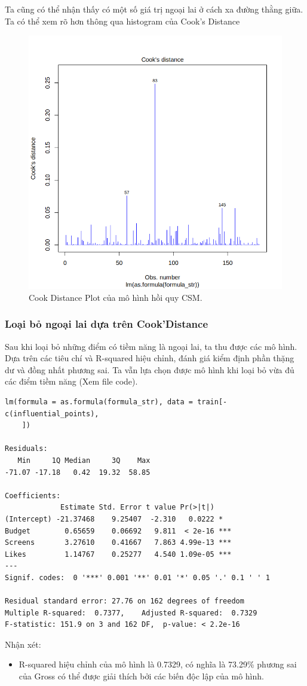 Ta cũng có thể nhận thấy có một số giá trị ngoại lai ở cách xa đường thằng giữa. Ta có thể xem rõ hơn thông qua histogram của Cook's Distance
\begin{figure}[H]
    \centering
    \includegraphics[width=0.75\columnwidth]{csm_figures/best_csm_model_cook.png}
    \caption{Cook Distance Plot của mô hình hồi quy CSM.}
    \label{fig:best_csm_model_cook}
\end{figure}

\subsubsection{Loại bỏ ngoại lai dựa trên Cook'Distance}

Sau khi loại bỏ những điểm có tiềm năng là ngoại lai, ta thu được các mô hình. Dựa trên các tiêu chí và R-squared hiệu chỉnh, đánh giá kiểm định phần thặng dư và đồng nhất phương sai. Ta vẫn lựa chọn được mô hình khi loại bỏ vừa đủ các điểm tiềm năng (Xem file code).

\begin{lstlisting}
lm(formula = as.formula(formula_str), data = train[-c(influential_points), 
    ])

Residuals:
   Min     1Q Median     3Q    Max 
-71.07 -17.18   0.42  19.32  58.85 

Coefficients:
             Estimate Std. Error t value Pr(>|t|)    
(Intercept) -21.37468    9.25407  -2.310   0.0222 *  
Budget        0.65659    0.06692   9.811  < 2e-16 ***
Screens       3.27610    0.41667   7.863 4.99e-13 ***
Likes         1.14767    0.25277   4.540 1.09e-05 ***
---
Signif. codes:  0 '***' 0.001 '**' 0.01 '*' 0.05 '.' 0.1 ' ' 1

Residual standard error: 27.76 on 162 degrees of freedom
Multiple R-squared:  0.7377,	Adjusted R-squared:  0.7329 
F-statistic: 151.9 on 3 and 162 DF,  p-value: < 2.2e-16
\end{lstlisting}
Nhận xét:
\begin{itemize}
    \item R-squared hiệu chỉnh của mô hình là 0.7329, có nghĩa là 73.29\% phương sai của Gross có thể được giải thích bởi các biến độc lập của mô hình.
\end{itemize}

